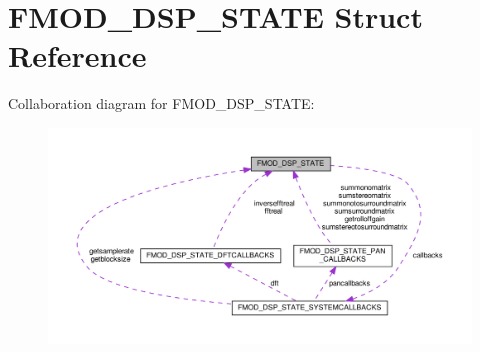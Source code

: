 \hypertarget{structFMOD__DSP__STATE}{}\section{F\+M\+O\+D\+\_\+\+D\+S\+P\+\_\+\+S\+T\+A\+TE Struct Reference}
\label{structFMOD__DSP__STATE}


Collaboration diagram for F\+M\+O\+D\+\_\+\+D\+S\+P\+\_\+\+S\+T\+A\+TE\+:
\nopagebreak
\begin{figure}[H]
\begin{center}
\leavevmode
\includegraphics[width=350pt]{structFMOD__DSP__STATE__coll__graph}
\end{center}
\end{figure}
